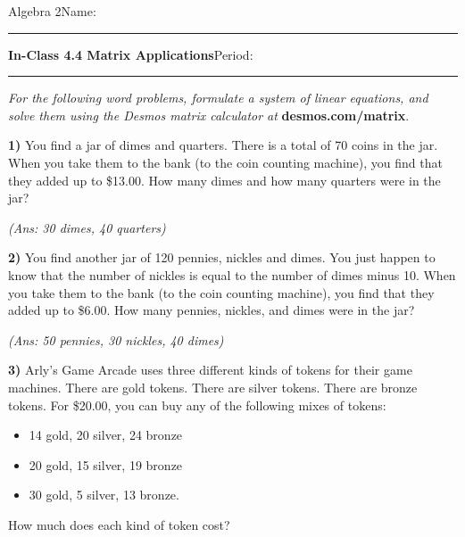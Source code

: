\documentclass[10pt,letterpaper]{memoir}
\begin{document}
\pagestyle{plain}
\checkandfixthelayout
\raggedbottom



{\small Algebra 2}\hfill Name: \rule{2in}{0.15mm}

{\bfseries\Large In-Class 4.4 Matrix Applications}\hfill Period: \rule{0.5in}{0.15mm}

{\itshape
For the following word problems, formulate a system of linear equations,
and solve them using the Desmos matrix calculator at
} 
{\bfseries\ttfamily desmos.com/matrix}.
\vspace{1.5em}




{\bfseries\large 1)} 
You find a jar of dimes and quarters.
There is a total of 70 coins in the jar.
When you take them to the bank (to the coin counting machine),
you find that they added up to \$13.00.
How many dimes and how many quarters were in the jar?

\myWideMatrixTable[-0.1in]
\vspace{0.5in}
\hfill{\itshape (Ans: 30 dimes, 40 quarters)}
\vspace{2em}




{\bfseries\large 2)} 
You find another jar of 120 pennies, nickles and dimes.
You just happen to know that 
the number of nickles is equal to the number of dimes minus 10.
When you take them to the bank (to the coin counting machine),
you find that they added up to \$6.00.
How many pennies, nickles, and dimes were in the jar?

\myWideMatrixTable[-0.1in]

\vspace{0.5in}
\hfill{\itshape (Ans: 50 pennies, 30 nickles, 40 dimes)}
\vspace{2em}



\newpage
{\bfseries\large 3)} 
Arly's Game Arcade uses three different kinds of tokens for their game machines.
There are gold tokens.
There are silver tokens.
There are bronze tokens.
For \$20.00, you can buy any of the following mixes of tokens:
\begin{itemize}[itemsep=0in]
    \item 14 gold, 20 silver, 24 bronze
    \item 20 gold, 15 silver, 19 bronze
    \item 30 gold, 5 silver, 13 bronze.
\end{itemize}
How much does each kind of token cost?
\end{document}
